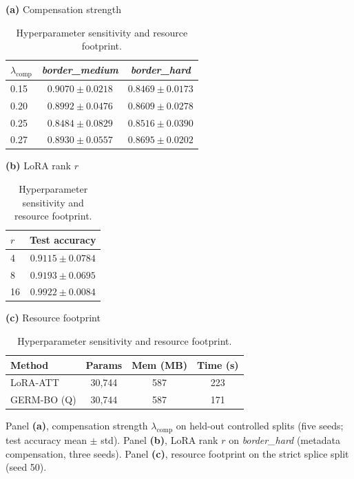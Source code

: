 \documentclass[12pt,letterpaper]{article}
\newcommand{\splitname}[1]{\textit{#1}}
\begin{document}
\begin{table}[!htb]
\centering
\caption{Hyperparameter sensitivity and resource footprint.}
\label{tab:comp-sensitivity}\label{tab:rank-sensitivity}\label{tab:resource-footprint}
\footnotesize
\setlength{\tabcolsep}{3pt}
\begin{minipage}[t]{0.50\textwidth}
\centering
\textbf{(a)} Compensation strength\\[2pt]
\begin{tabular}{@{}lcc@{}}
\toprule
$\lambda_{\mathrm{comp}}$ & \splitname{border\_medium} & \splitname{border\_hard} \\
\midrule
0.15 & $0.9070 \pm 0.0218$ & $0.8469 \pm 0.0173$ \\
0.20 & $0.8992 \pm 0.0476$ & $0.8609 \pm 0.0278$ \\
0.25 & $0.8484 \pm 0.0829$ & $0.8516 \pm 0.0390$ \\
0.27 & $0.8930 \pm 0.0557$ & $\mathbf{0.8695 \pm 0.0202}$ \\
\bottomrule
\end{tabular}
\vspace{6pt}

\textbf{(b)} LoRA rank $r$\\[2pt]
\begin{tabular}{@{}lc@{}}
\toprule
$r$ & Test accuracy \\
\midrule
4  & $0.9115 \pm 0.0784$ \\
8  & $0.9193 \pm 0.0695$ \\
16 & $0.9922 \pm 0.0084$ \\
\bottomrule
\end{tabular}
\end{minipage}\hfill
\begin{minipage}[t]{0.44\textwidth}
\centering
\textbf{(c)} Resource footprint\\[2pt]
\begin{tabular}{@{}lccc@{}}
\toprule
Method & Params & Mem (MB) & Time (s) \\
\midrule
LoRA-ATT & 30{,}744 & 587 & 223 \\
GERM-BO (Q) & 30{,}744 & 587 & 171 \\
\bottomrule
\end{tabular}
\end{minipage}

Panel \textbf{(a)}, compensation strength $\lambda_{\mathrm{comp}}$ on held-out controlled splits (five seeds; test accuracy mean $\pm$ std). Panel \textbf{(b)}, LoRA rank $r$ on \splitname{border\_hard} (metadata compensation, three seeds). Panel \textbf{(c)}, resource footprint on the strict splice split (seed 50).
\end{table}
\end{document}
